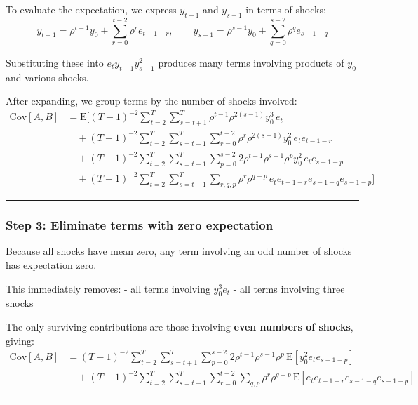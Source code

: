 \documentclass[11pt]{article}
\begin{document}
To evaluate the expectation, we express \(y_{t-1}\) and \(y_{s-1}\) in
terms of shocks: \[
y_{t-1}=\rho^{t-1}y_{0}+\sum_{r=0}^{t-2}\rho^r e_{t-1-r},
\qquad
y_{s-1}=\rho^{s-1}y_{0}+\sum_{q=0}^{s-2}\rho^q e_{s-1-q}
\]

Substituting these into \(e_t y_{t-1} y_{s-1}^2\) produces many terms
involving products of \(y_0\) and various shocks.

After expanding, we group terms by the number of shocks involved: \[
\begin{aligned}
\text{Cov}[A,B]
&=\text{E}\Bigg[
(T-1)^{-2}\sum_{t=2}^T\sum_{s=t+1}^T
\rho^{t-1}\rho^{2(s-1)} y_0^3\, e_t \\
&\quad+
(T-1)^{-2}\sum_{t=2}^T\sum_{s=t+1}^T\sum_{r=0}^{t-2}
\rho^{r}\rho^{2(s-1)} y_0^2\, e_t e_{t-1-r} \\
&\quad+
(T-1)^{-2}\sum_{t=2}^T\sum_{s=t+1}^T\sum_{p=0}^{s-2}
2\rho^{t-1}\rho^{s-1}\rho^{p} y_0^2\, e_t e_{s-1-p} \\
&\quad+
(T-1)^{-2}\sum_{t=2}^T\sum_{s=t+1}^T\sum_{r,q,p}
\rho^{r}\rho^{q+p}\, e_t e_{t-1-r} e_{s-1-q} e_{s-1-p}
\Bigg]
\end{aligned}
\]

\begin{center}\rule{0.5\linewidth}{0.5pt}\end{center}

\subsubsection{Step 3: Eliminate terms with zero
expectation}\label{step-3-eliminate-terms-with-zero-expectation}

Because all shocks have mean zero, any term involving an odd number of
shocks has expectation zero.

This immediately removes: - all terms involving \(y_0^3 e_t\) - all
terms involving three shocks

The only surviving contributions are those involving \textbf{even
numbers of shocks}, giving: \[
\begin{aligned}
\text{Cov}[A,B]
&=
(T-1)^{-2}\sum_{t=2}^T\sum_{s=t+1}^T\sum_{p=0}^{s-2}
2\rho^{t-1}\rho^{s-1}\rho^{p}\,\text{E}[y_0^2 e_t e_{s-1-p}]\\
&\quad+
(T-1)^{-2}\sum_{t=2}^T\sum_{s=t+1}^T\sum_{r=0}^{t-2}\sum_{q,p}
\rho^{r}\rho^{q+p}\,\text{E}[e_t e_{t-1-r} e_{s-1-q} e_{s-1-p}]
\end{aligned}
\]

\begin{center}\rule{0.5\linewidth}{0.5pt}\end{center}
\end{document}
